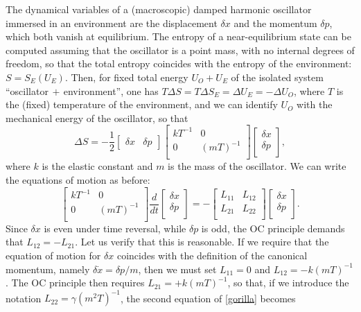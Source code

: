\documentclass[a4paper, amsfonts, amssymb, amsmath, reprint, showkeys, nofootinbib, twoside, onecolumn,notitlepage]{revtex4-1}
\begin{document}
The dynamical variables of a (macroscopic) damped harmonic oscillator immersed in an environment are the displacement $\delta x$ and the momentum $\delta p$, which both vanish at equilibrium. The entropy of a near-equilibrium state can be computed assuming that the oscillator is a point mass, with no internal degrees of freedom, so that the total entropy coincides with the entropy of the environment: $S=S_E(U_E)$. Then,  for fixed total energy $U_O+U_E$ of the isolated system ``oscillator$\, + \,$environment'', one has $T\Delta S= T\Delta S_{E}=\Delta U_E = -\Delta U_O$, where $T$ is the (fixed) temperature of the environment, and we can identify $U_O$ with the mechanical energy of the oscillator, so that
\begin{equation}
\Delta S =-\dfrac{1}{2}
\begin{bmatrix}
\delta  x &  \delta p
\end{bmatrix}
\begin{bmatrix}
kT^{-1} & 0 \\
0 & (mT)^{-1}  \\
\end{bmatrix}
\begin{bmatrix}
\delta x \\
\delta p \\
\end{bmatrix} ,
\end{equation}
where $k$ is the elastic constant and $m$ is the mass of the oscillator. We can write the equations of motion as before:
\begin{equation}\label{gorilla}
\begin{bmatrix}
kT^{-1} & 0 \\
0 & (mT)^{-1}  \\
\end{bmatrix}
\dfrac{d}{dt}
\begin{bmatrix}
\delta x \\
\delta p \\
\end{bmatrix}
= -
\begin{bmatrix}
L_{11} & L_{12} \\
L_{21} & L_{22}  \\
\end{bmatrix}
\begin{bmatrix}
\delta x \\
\delta p \\
\end{bmatrix} .
\end{equation}
Since $\delta x$ is even under time reversal, while $\delta p$ is odd, the OC principle demands that $L_{12}=-L_{21}$. Let us verify that this is reasonable. If we require that the equation of motion for $\delta x$ coincides with the definition of the canonical momentum, namely $\delta \dot{x}=\delta p/m$, then we must set $L_{11}=0$ and $L_{12}=-k(mT)^{-1}$. The OC principle then requires $L_{21}=+k(mT)^{-1}$, so that, if we introduce the notation $L_{22}=\gamma (m^2 T)^{-1}$, the second equation of \eqref{gorilla} becomes
\end{document}
